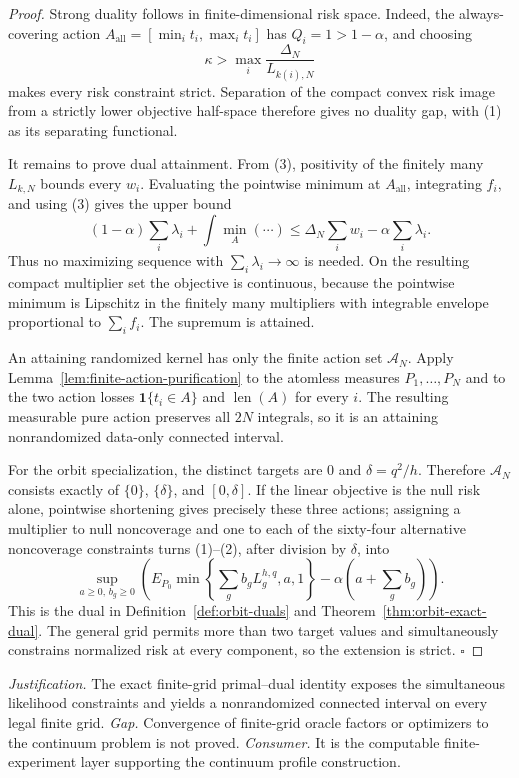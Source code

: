 \documentclass{article}
\begin{document}
\begin{proof}
Strong duality follows in finite-dimensional risk space.  Indeed, the always-covering action
\(A_{\mathrm{all}}=[\min_i t_i,\max_i t_i]\) has \(Q_i=1>1-\alpha\), and choosing
\[
 \kappa>\max_i\frac{\Delta_N}{L_{k(i),N}}
\]
makes every risk constraint strict.  Separation of the compact convex risk image from a strictly lower objective half-space therefore gives no duality gap, with (1) as its separating functional.

It remains to prove dual attainment.  From (3), positivity of the finitely many \(L_{k,N}\) bounds every \(w_i\).  Evaluating the pointwise minimum at \(A_{\mathrm{all}}\), integrating \(f_i\), and using (3) gives the upper bound
\[
 (1-\alpha)\sum_i\lambda_i+\int\min_A(\cdots)
 \leq \Delta_N\sum_iw_i-\alpha\sum_i\lambda_i.
\tag{4}
\]
Thus no maximizing sequence with \(\sum_i\lambda_i\to\infty\) is needed.  On the resulting compact multiplier set the objective is continuous, because the pointwise minimum is Lipschitz in the finitely many multipliers with integrable envelope proportional to \(\sum_i f_i\).  The supremum is attained.

An attaining randomized kernel has only the finite action set \(\mathcal A_N\).  Apply Lemma~\ref{lem:finite-action-purification} to the atomless measures \(P_1,\ldots,P_N\) and to the two action losses \(\mathbf1\{t_i\in A\}\) and \(\operatorname{len}(A)\) for every \(i\).  The resulting measurable pure action preserves all \(2N\) integrals, so it is an attaining nonrandomized data-only connected interval.

For the orbit specialization, the distinct targets are \(0\) and \(\delta=q^2/h\).  Therefore \(\mathcal A_N\) consists exactly of \(\{0\}\), \(\{\delta\}\), and \([0,\delta]\).  If the linear objective is the null risk alone, pointwise shortening gives precisely these three actions; assigning a multiplier to null noncoverage and one to each of the sixty-four alternative noncoverage constraints turns (1)--(2), after division by \(\delta\), into
\[
 \sup_{a\geq0,\,b_g\geq0}
 \left(E_{P_0}\min\left\{\sum_gb_gL_g^{h,q},a,1\right\}
 -\alpha\left(a+\sum_gb_g\right)\right).
\]
This is the dual in Definition~\ref{def:orbit-duals} and Theorem~\ref{thm:orbit-exact-dual}.  The general grid permits more than two target values and simultaneously constrains normalized risk at every component, so the extension is strict. \(\square\)
\end{proof}
\par\smallskip\noindent \textit{Justification.} The exact finite-grid primal--dual identity exposes the simultaneous likelihood constraints and yields a nonrandomized connected interval on every legal finite grid. \textit{Gap.} Convergence of finite-grid oracle factors or optimizers to the continuum problem is not proved. \textit{Consumer.} It is the computable finite-experiment layer supporting the continuum profile construction.
\end{document}
